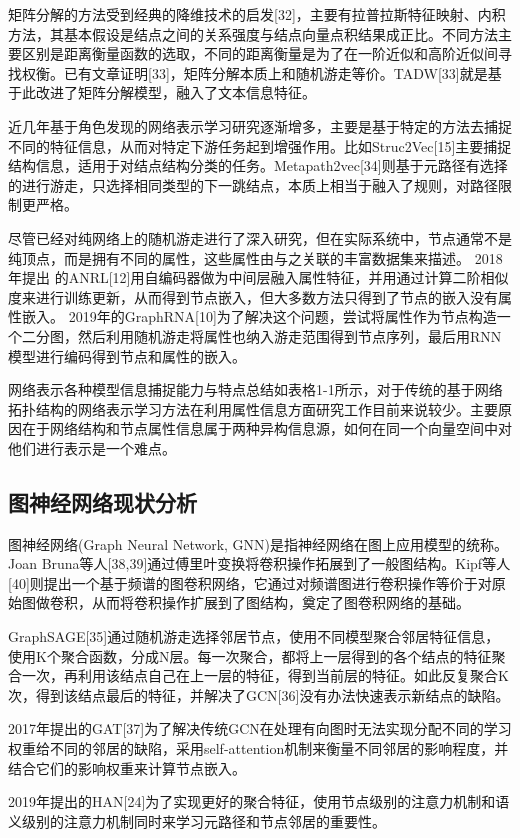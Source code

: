 \documentclass[algorithmlist, figurelist,tablelist, nomlist,masters]{seuthesix}
\begin{document}
矩阵分解的方法受到经典的降维技术的启发[32]，主要有拉普拉斯特征映射、内积方法，其基本假设是结点之间的关系强度与结点向量点积结果成正比。不同方法主要区别是距离衡量函数的选取，不同的距离衡量是为了在一阶近似和高阶近似间寻找权衡。已有文章证明[33]，矩阵分解本质上和随机游走等价。TADW[33]就是基于此改进了矩阵分解模型，融入了文本信息特征。

近几年基于角色发现的网络表示学习研究逐渐增多，主要是基于特定的方法去捕捉不同的特征信息，从而对特定下游任务起到增强作用。比如Struc2Vec[15]主要捕捉结构信息，适用于对结点结构分类的任务。Metapath2vec[34]则基于元路径有选择的进行游走，只选择相同类型的下一跳结点，本质上相当于融入了规则，对路径限制更严格。

尽管已经对纯网络上的随机游走进行了深入研究，但在实际系统中，节点通常不是纯顶点，而是拥有不同的属性，这些属性由与之关联的丰富数据集来描述。
2018年提出	的ANRL[12]用自编码器做为中间层融入属性特征，并用通过计算二阶相似度来进行训练更新，从而得到节点嵌入，但大多数方法只得到了节点的嵌入没有属性嵌入。    2019年的GraphRNA[10]为了解决这个问题，尝试将属性作为节点构造一个二分图，然后利用随机游走将属性也纳入游走范围得到节点序列，最后用RNN模型进行编码得到节点和属性的嵌入。

网络表示各种模型信息捕捉能力与特点总结如表格1-1所示，对于传统的基于网络拓扑结构的网络表示学习方法在利用属性信息方面研究工作目前来说较少。主要原因在于网络结构和节点属性信息属于两种异构信息源，如何在同一个向量空间中对他们进行表示是一个难点。

\subsection{图神经网络现状分析}
图神经网络(Graph Neural Network, GNN)是指神经网络在图上应用模型的统称。Joan Bruna等人[38,39]通过傅里叶变换将卷积操作拓展到了一般图结构。Kipf等人[40]则提出一个基于频谱的图卷积网络，它通过对频谱图进行卷积操作等价于对原始图做卷积，从而将卷积操作扩展到了图结构，奠定了图卷积网络的基础。

GraphSAGE[35]通过随机游走选择邻居节点，使用不同模型聚合邻居特征信息，使用K个聚合函数，分成N层。每一次聚合，都将上一层得到的各个结点的特征聚合一次，再利用该结点自己在上一层的特征，得到当前层的特征。如此反复聚合K次，得到该结点最后的特征，并解决了GCN[36]没有办法快速表示新结点的缺陷。

2017年提出的GAT[37]为了解决传统GCN在处理有向图时无法实现分配不同的学习权重给不同的邻居的缺陷，采用self-attention机制来衡量不同邻居的影响程度，并结合它们的影响权重来计算节点嵌入。

2019年提出的HAN[24]为了实现更好的聚合特征，使用节点级别的注意力机制和语义级别的注意力机制同时来学习元路径和节点邻居的重要性。
\end{document}
